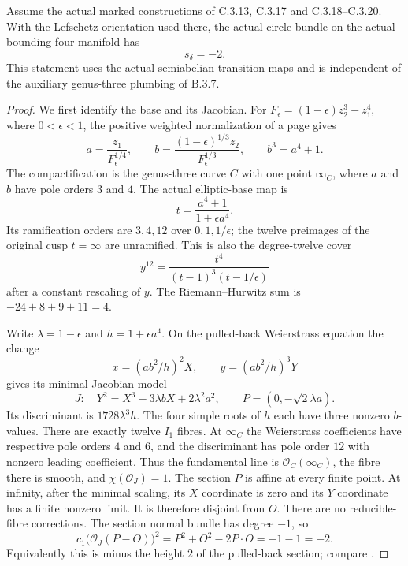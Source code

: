 \begin{proposition}
Assume the actual marked constructions of C.3.13, C.3.17 and
C.3.18--C.3.20.  With the Lefschetz orientation used there, the
actual circle bundle on the actual bounding four-manifold has
\[
 s_\delta=-2.
\]
This statement uses the actual semiabelian transition maps and is
independent of the auxiliary genus-three plumbing of B.3.7.
\end{proposition}
\begin{proof}
We first identify the base and its Jacobian.  For
$F_\epsilon=(1-\epsilon)z_2^3-z_1^4$, where $0<\epsilon<1$,
the positive weighted normalization of a page gives
\[
 a=\frac{z_1}{F_\epsilon^{1/4}},\qquad
 b=\frac{(1-\epsilon)^{1/3}z_2}{F_\epsilon^{1/3}},
 \qquad b^3=a^4+1.
\]
The compactification is the genus-three curve $C$ with one point
$\infty_C$, where $a$ and $b$ have pole orders $3$ and $4$.
The actual elliptic-base map is
\[
 t=\frac{a^4+1}{1+\epsilon a^4}.
\]
Its ramification orders are $3,4,12$ over $0,1,1/\epsilon$;
the twelve preimages of the original cusp $t=\infty$ are unramified.
This is also the degree-twelve cover
\[
 y^{12}=\frac{t^4}{(t-1)^3(t-1/\epsilon)}
\]
after a constant rescaling of $y$.  The Riemann--Hurwitz sum is
$-24+8+9+11=4$.

Write $\lambda=1-\epsilon$ and $h=1+\epsilon a^4$.  On the
pulled-back Weierstrass equation the change
\[
 x=(ab^2/h)^2X,\qquad y=(ab^2/h)^3Y
\]
gives its minimal Jacobian model
\[
 J:\quad Y^2=X^3-3\lambda bX+2\lambda^2a^2,
 \qquad P=(0,-\sqrt2\lambda a).
\]
Its discriminant is $1728\lambda^3h$.  The four simple roots
of $h$ each have three nonzero $b$-values.  There are exactly
twelve $I_1$ fibres.  At $\infty_C$ the Weierstrass coefficients
have respective pole orders $4$ and $6$, and the discriminant
has pole order $12$ with nonzero leading coefficient.  Thus
the fundamental line is $\mathcal O_C(\infty_C)$, the fibre
there is smooth, and $\chi(\mathcal O_J)=1$.
The section $P$ is affine at every finite point.  At infinity,
after the minimal scaling, its $X$ coordinate is zero and its
$Y$ coordinate has a finite nonzero limit.  It is therefore
disjoint from $O$.  There are no reducible-fibre corrections.
The section normal bundle has degree $-1$, so
\[
 c_1\bigl(\mathcal O_J(P-O)\bigr)^2
       =P^2+O^2-2P\cdot O=-1-1=-2.
\]
Equivalently this is minus the height $2$ of the pulled-back
section; compare \citet[Theorem 8.6]{Shioda90}.


\end{proof}
